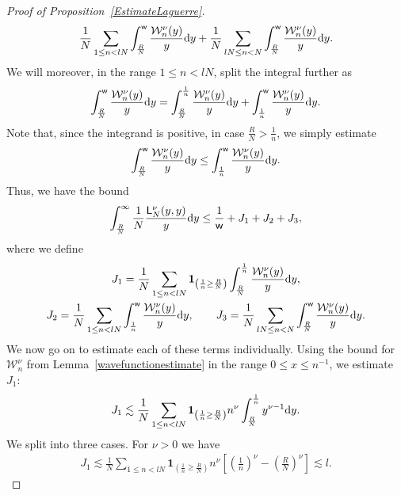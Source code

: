 \documentclass[pdftex]{sigma}
\numberwithin{equation}{section}
\begin{document}
\begin{proof}[Proof of Proposition~\ref{EstimateLaguerre}]
\begin{gather*}
\frac{1}{N}\sum_{1 \le n < lN}^{} \int_{\frac{R}{N}}^{\mathsf{w}}\frac{\mathcal{W}_n^{\nu}(y)}{y}{\rm d}y+\frac{1}{N}\sum_{l N \le n < N}^{} \int_{\frac{R}{N}}^{\mathsf{w}}\frac{\mathcal{W}_n^{\nu}(y)}{y}{\rm d}y.
\end{gather*}
We will moreover, in the range $1 \le n < l N$, split the integral further as
\begin{gather*}
\int_{\frac{R}{N}}^{\mathsf{w}}\frac{\mathcal{W}_n^{\nu}(y)}{y}{\rm d}y =\int_{\frac{R}{N}}^{\frac{1}{n}}\frac{\mathcal{W}_n^{\nu}(y)}{y}{\rm d}y+\int_{\frac{1}{n}}^{\mathsf{w}}\frac{\mathcal{W}_n^{\nu}(y)}{y}{\rm d}y.
\end{gather*}
Note that, since the integrand is positive, in case $\frac{R}{N}>\frac{1}{n}$, we simply estimate
\begin{gather*}
\int_{\frac{R}{N}}^{\mathsf{w}}\frac{\mathcal{W}_n^{\nu}(y)}{y}{\rm d}y \le \int_{\frac{1}{n}}^{\mathsf{w}}\frac{\mathcal{W}_n^{\nu}(y)}{y}{\rm d}y.
\end{gather*}
Thus, we have the bound
\begin{gather*}
\int_{\frac{R}{N}}^{\infty}\frac{1}{N}\frac{\mathsf{L}_N^{\nu}(y,y)}{y}{\rm d}y \le \frac{1}{\mathsf{w}}+J_1+J_2+J_3,
\end{gather*}
where we define
\begin{gather*}
J_1 = \frac{1}{N}\sum_{1 \le n < lN}^{} \textbf{1}_{\left(\frac{1}{n}\ge \frac{R}{N}\right)} \int_{\frac{R}{N}}^{\frac{1}{n}}\frac{\mathcal{W}_n^{\nu}(y)}{y}{\rm d}y,\\
J_2 = \frac{1}{N}\sum_{1 \le n < lN}^{} \int_{\frac{1}{n}}^{\mathsf{w}}\frac{\mathcal{W}_n^{\nu}(y)}{y}{\rm d}y,\qquad
J_3 = \frac{1}{N}\sum_{l N \le n < N}^{} \int_{\frac{R}{N}}^{\mathsf{w}}\frac{\mathcal{W}_n^{\nu}(y)}{y}{\rm d}y.
\end{gather*}
We now go on to estimate each of these terms individually. Using the bound for $\mathcal{W}_n^{\nu}$ from Lemma~\ref{wavefunctionestimate} in the range $0 \le x \le n^{-1}$, we estimate $J_1$:
\begin{gather*}
J_1 \lesssim \frac{1}{N} \sum_{1 \le n < lN}^{}\textbf{1}_{\left(\frac{1}{n}\ge \frac{R}{N}\right)} n^{\nu} \int_{\frac{R}{N}}^{\frac{1}{n}}y^{\nu-1}{\rm d}y.
\end{gather*}
We split into three cases. For $\nu>0$ we have
\begin{gather*}
J_1 \lesssim \frac{1}{N} \sum_{1 \le n < lN}^{}\textbf{1}_{\left(\frac{1}{n}\ge \frac{R}{N}\right)}n^{\nu} \left[\left(\frac{1}{n}\right)^\nu-\left(\frac{R}{N}\right)^\nu\right]\lesssim l.

\end{gather*}
\end{proof}
\end{document}

